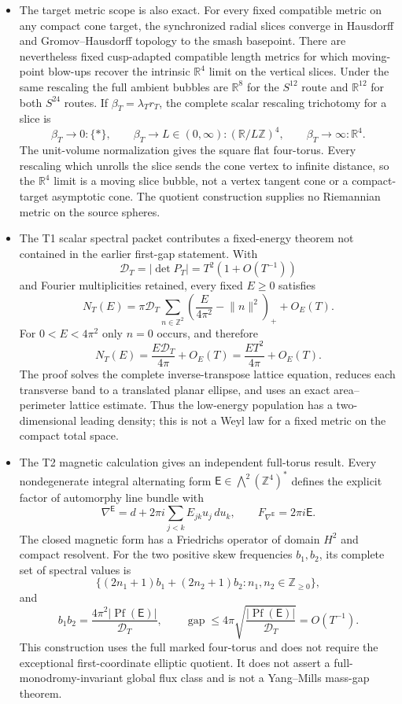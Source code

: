 \begin{itemize}[leftmargin=1.8em]
\item The target metric scope is also exact.  For every fixed compatible
metric on any compact cone target, the synchronized radial slices converge
in Hausdorff and Gromov--Hausdorff topology to the smash basepoint.  There
are nevertheless fixed cusp-adapted compatible length metrics for which
moving-point blow-ups recover the intrinsic \(\mathbb R^4\) limit on the
vertical slices.  Under the same rescaling the full ambient bubbles are
\(\mathbb R^8\) for the \(S^{12}\) route and \(\mathbb R^{12}\) for both
\(S^{24}\) routes.  If \(\beta_T=\lambda_Tr_T\), the complete scalar
rescaling trichotomy for a slice is
\[
 \beta_T\to0:\{*\},\qquad
 \beta_T\to L\in(0,\infty):
 (\mathbb R/L\mathbb Z)^4,\qquad
 \beta_T\to\infty:\mathbb R^4.
\]
The unit-volume normalization gives the square flat four-torus.  Every
rescaling which unrolls the slice sends the cone vertex to infinite distance,
so the \(\mathbb R^4\) limit is a moving slice bubble, not a vertex tangent
cone or a compact-target asymptotic cone.  The quotient construction supplies
no Riemannian metric on the source spheres.

\item The T1 scalar spectral packet contributes a fixed-energy theorem not
contained in the earlier first-gap statement.  With
\[
 \mathcal D_T=|\det P_T|=T^2(1+O(T^{-1}))
\]
and Fourier multiplicities retained, every fixed \(E\geq0\) satisfies
\[
 N_T(E)=\pi\mathcal D_T
 \sum_{n\in\mathbb Z^2}
 \left(\frac{E}{4\pi^2}-\lVert n\rVert^2\right)_+
 +O_E(T).
\]
For \(0<E<4\pi^2\) only \(n=0\) occurs, and therefore
\[
 N_T(E)=\frac{E\mathcal D_T}{4\pi}+O_E(T)
       =\frac{ET^2}{4\pi}+O_E(T).
\]
The proof solves the complete inverse-transpose lattice equation, reduces
each transverse band to a translated planar ellipse, and uses an exact
area--perimeter lattice estimate.  Thus the low-energy population has a
two-dimensional leading density; this is not a Weyl law for a fixed metric
on the compact total space.

\item The T2 magnetic calculation gives an independent full-torus result.
Every nondegenerate integral alternating form
\(\mathsf E\in\bigwedge^2(\mathbb Z^4)^*\) defines the explicit factor of
automorphy line bundle with
\[
 \nabla^{\mathsf E}=d+2\pi i\sum_{j<k}E_{jk}u_j\,du_k,
 \qquad F_{\nabla^{\mathsf E}}=2\pi i\mathsf E.
\]
The closed magnetic form has a Friedrichs operator of domain \(H^2\) and
compact resolvent.  For the two positive skew frequencies \(b_1,b_2\), its
complete set of spectral values is
\[
 \{(2n_1+1)b_1+(2n_2+1)b_2:n_1,n_2\in\mathbb Z_{\geq0}\},
\]
and
\[
 b_1b_2=\frac{4\pi^2|\operatorname{Pf}(\mathsf E)|}{\mathcal D_T},
 \qquad
 \operatorname{gap}\leq
 4\pi\sqrt{\frac{|\operatorname{Pf}(\mathsf E)|}{\mathcal D_T}}
 =O(T^{-1}).
\]
This construction uses the full marked four-torus and does not require the
exceptional first-coordinate elliptic quotient.  It does not assert a
full-monodromy-invariant global flux class and is not a Yang--Mills mass-gap
theorem.


\end{itemize}
